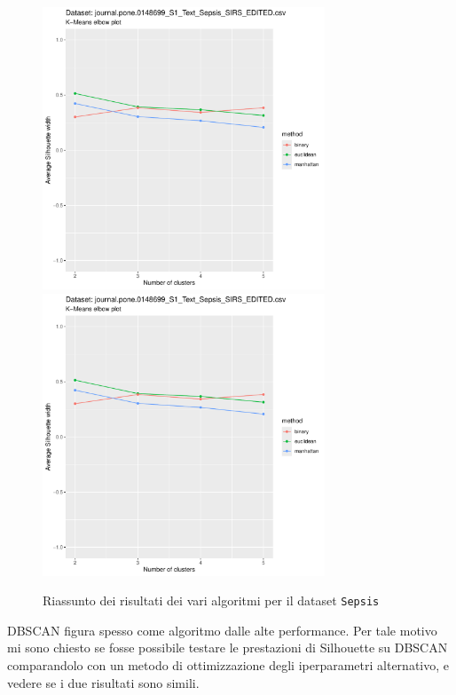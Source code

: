 \documentclass[a4paper, 12pt]{report}
\begin{document}
			\begin{figure}[H]
				\centering
				\includegraphics[width = 0.75\textwidth, height = 0.45\textheight, page = 9]{
					results/results_Sepsis.csv.pdf
				}
				\includegraphics[width = 0.75\textwidth, height = 0.45\textheight, page = 10]{
					results/results_Sepsis.csv.pdf
				}
				\caption{Riassunto dei risultati dei vari algoritmi per il dataset
				\texttt{Sepsis}}
				\label{fig:comp5}
			\end{figure}

			DBSCAN figura spesso come algoritmo dalle alte performance.
			Per tale motivo mi sono chiesto se fosse possibile testare
			le prestazioni di Silhouette su DBSCAN comparandolo con un
			metodo di ottimizzazione degli iperparametri alternativo, e
			vedere se i due risultati sono simili.
\end{document}
